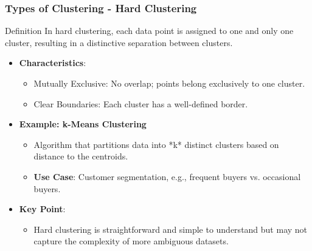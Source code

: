 \documentclass[aspectratio=169]{beamer}
\begin{document}
\begin{frame}[fragile]
    \frametitle{Types of Clustering - Hard Clustering}
    \begin{block}{Definition}
        In hard clustering, each data point is assigned to one and only one cluster, resulting in a distinctive separation between clusters.
    \end{block}

    \begin{itemize}
        \item \textbf{Characteristics}:
        \begin{itemize}
            \item Mutually Exclusive: No overlap; points belong exclusively to one cluster.
            \item Clear Boundaries: Each cluster has a well-defined border.
        \end{itemize}

        \item \textbf{Example: k-Means Clustering}
        \begin{itemize}
            \item Algorithm that partitions data into *k* distinct clusters based on distance to the centroids.
            \item \textbf{Use Case}: Customer segmentation, e.g., frequent buyers vs. occasional buyers.
        \end{itemize}
        
        \item \textbf{Key Point}: 
        \begin{itemize}
            \item Hard clustering is straightforward and simple to understand but may not capture the complexity of more ambiguous datasets.
        \end{itemize}
    \end{itemize}
\end{frame}
\end{document}
